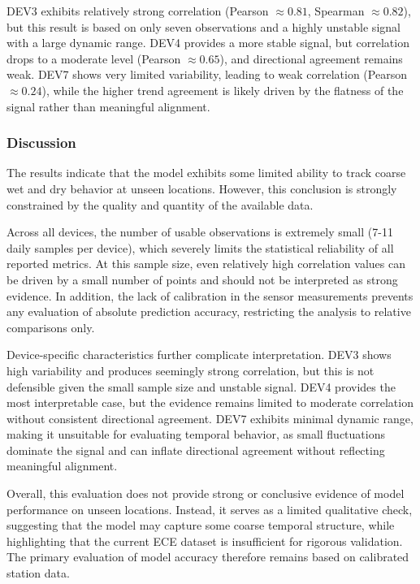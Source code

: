 DEV3 exhibits relatively strong correlation (Pearson $\approx 0.81$, Spearman $\approx 0.82$), but this result is based on only seven observations and a highly unstable signal with a large dynamic range. DEV4 provides a more stable signal, but correlation drops to a moderate level (Pearson $\approx 0.65$), and directional agreement remains weak. DEV7 shows very limited variability, leading to weak correlation (Pearson $\approx 0.24$), while the higher trend agreement is likely driven by the flatness of the signal rather than meaningful alignment.

\subsubsection*{Discussion}
The results indicate that the model exhibits some limited ability to track coarse wet and dry behavior at unseen locations. However, this conclusion is strongly constrained by the quality and quantity of the available data.

Across all devices, the number of usable observations is extremely small (7-11 daily samples per device), which severely limits the statistical reliability of all reported metrics. At this sample size, even relatively high correlation values can be driven by a small number of points and should not be interpreted as strong evidence. In addition, the lack of calibration in the sensor measurements prevents any evaluation of absolute prediction accuracy, restricting the analysis to relative comparisons only.

Device-specific characteristics further complicate interpretation. DEV3 shows high variability and produces seemingly strong correlation, but this is not defensible given the small sample size and unstable signal. DEV4 provides the most interpretable case, but the evidence remains limited to moderate correlation without consistent directional agreement. DEV7 exhibits minimal dynamic range, making it unsuitable for evaluating temporal behavior, as small fluctuations dominate the signal and can inflate directional agreement without reflecting meaningful alignment.

Overall, this evaluation does not provide strong or conclusive evidence of model performance on unseen locations. Instead, it serves as a limited qualitative check, suggesting that the model may capture some coarse temporal structure, while highlighting that the current ECE dataset is insufficient for rigorous validation. The primary evaluation of model accuracy therefore remains based on calibrated station data.
